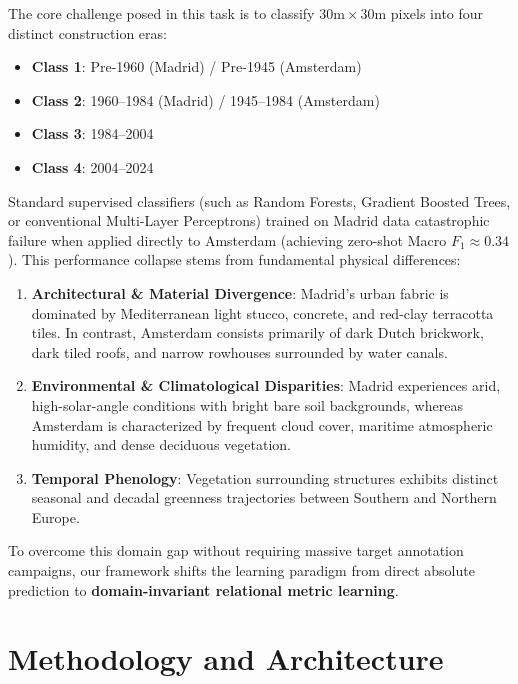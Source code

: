 \documentclass[11pt,a4paper]{article}
\begin{document}
The core challenge posed in this task is to classify $30\text{m} \times 30\text{m}$ pixels into four distinct construction eras:
\begin{itemize}
    \item \textbf{Class 1}: Pre-1960 (Madrid) / Pre-1945 (Amsterdam)
    \item \textbf{Class 2}: 1960--1984 (Madrid) / 1945--1984 (Amsterdam)
    \item \textbf{Class 3}: 1984--2004
    \item \textbf{Class 4}: 2004--2024
\end{itemize}

Standard supervised classifiers (such as Random Forests, Gradient Boosted Trees, or conventional Multi-Layer Perceptrons) trained on Madrid data catastrophic failure when applied directly to Amsterdam (achieving zero-shot Macro $F_1 \approx 0.34$). This performance collapse stems from fundamental physical differences:
\begin{enumerate}
    \item \textbf{Architectural \& Material Divergence}: Madrid's urban fabric is dominated by Mediterranean light stucco, concrete, and red-clay terracotta tiles. In contrast, Amsterdam consists primarily of dark Dutch brickwork, dark tiled roofs, and narrow rowhouses surrounded by water canals.
    \item \textbf{Environmental \& Climatological Disparities}: Madrid experiences arid, high-solar-angle conditions with bright bare soil backgrounds, whereas Amsterdam is characterized by frequent cloud cover, maritime atmospheric humidity, and dense deciduous vegetation.
    \item \textbf{Temporal Phenology}: Vegetation surrounding structures exhibits distinct seasonal and decadal greenness trajectories between Southern and Northern Europe.
\end{enumerate}

To overcome this domain gap without requiring massive target annotation campaigns, our framework shifts the learning paradigm from direct absolute prediction to \textbf{domain-invariant relational metric learning}.

\section{Methodology and Architecture}
\end{document}
